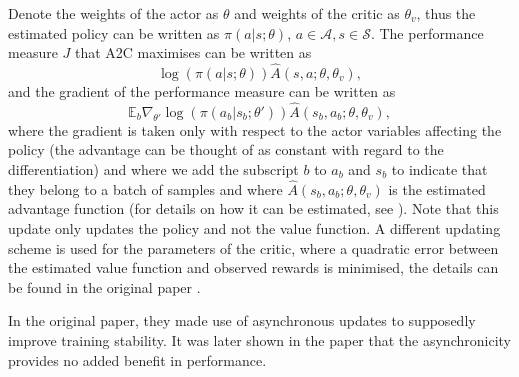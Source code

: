 Denote the weights of the actor as $\theta$ and weights of the critic as $\theta_v$, thus the estimated policy can be written as $\pi(a|s;\theta)$, $a \in \mathcal{A}, s \in \mathcal{S}$. The performance measure $J$ that A2C maximises can be written as 
\begin{equation*}
\log (\pi(a|s;\theta))\widehat{A}(s,a;\theta,\theta_v),
\end{equation*}
and the gradient of the performance measure can be written as
\begin{equation*}
\mathbb{E}_b \nabla_{\theta'} \log (\pi(a_b|s_b;\theta'))\widehat{A}(s_b,a_b;\theta,\theta_v),
\end{equation*}
where the gradient is taken only with respect to the actor variables affecting the policy (the advantage can be thought of as constant with regard to the differentiation) and where we add the subscript $b$ to $a_b$ and $s_b$ to indicate that they belong to a batch of samples and where $\widehat{A}(s_b,a_b;\theta,\theta_v)$ is the estimated advantage function (for details on how it can be estimated, see \cite[Section 4]{a3c_paper}). Note that this update only updates the policy and not the value function. A different updating scheme is used for the parameters of the critic, where a quadratic error between the estimated value function and observed rewards is minimised, the details can be found in the original paper \cite[Algorithm S3]{a3c_paper}.

In the original paper, they made use of asynchronous updates to supposedly improve training stability. It was later shown in the paper \cite{a3c_asynchrony_not_necessary} that the asynchronicity provides no added benefit in performance.

